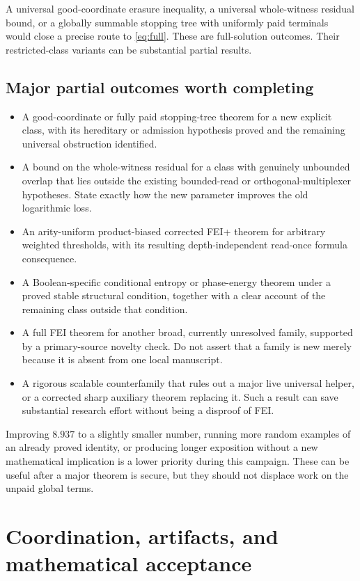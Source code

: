 \documentclass[11pt]{article}
\begin{document}
A universal good-coordinate erasure inequality, a universal
whole-witness residual bound, or a globally summable stopping
tree with uniformly paid terminals would close a precise route
to \eqref{eq:full}. These are full-solution outcomes. Their
restricted-class variants can be substantial partial results.

\subsection{Major partial outcomes worth completing}

\begin{itemize}
\item A good-coordinate or fully paid stopping-tree theorem for a new explicit class, with its hereditary or admission hypothesis proved and the remaining universal obstruction identified.
\item A bound on the whole-witness residual for a class with genuinely unbounded overlap that lies outside the existing bounded-read or orthogonal-multiplexer hypotheses. State exactly how the new parameter improves the old logarithmic loss.
\item An arity-uniform product-biased corrected FEI+ theorem for arbitrary weighted thresholds, with its resulting depth-independent read-once formula consequence.
\item A Boolean-specific conditional entropy or phase-energy theorem under a proved stable structural condition, together with a clear account of the remaining class outside that condition.
\item A full FEI theorem for another broad, currently unresolved family, supported by a primary-source novelty check. Do not assert that a family is new merely because it is absent from one local manuscript.
\item A rigorous scalable counterfamily that rules out a major live universal helper, or a corrected sharp auxiliary theorem replacing it. Such a result can save substantial research effort without being a disproof of FEI.
\end{itemize}

Improving $8.937$ to a slightly smaller number, running more random examples of an already proved identity, or producing longer exposition without a new mathematical implication is a lower priority during this campaign. These can be useful after a major theorem is secure, but they should not displace work on the unpaid global terms.

\section{Coordination, artifacts, and mathematical acceptance}
\end{document}
